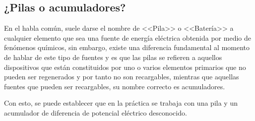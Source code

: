 \documentclass[10pt]{article}
\begin{document}
\begin{multicols}{2}
\subsection{¿Pilas o acumuladores?}

En el habla común, suele darse el nombre de <<Pila>> o <<Batería>> a cualquier elemento que sea una fuente de energía eléctrica obtenida por medio de fenómenos químicos, sin embargo, existe una diferencia fundamental al momento de hablar de este tipo de fuentes y es que las pilas se refieren a aquellos dispositivos que están constituidos por uno o varios elementos primarios que no pueden ser regenerados y por tanto no son recargables, mientras que aquellas fuentes que pueden ser recargables, su nombre correcto es acumuladores.

Con esto, se puede establecer que en la práctica se trabaja con una pila y un acumulador de diferencia de potencial eléctrico desconocido.


\end{multicols}
\end{document}
